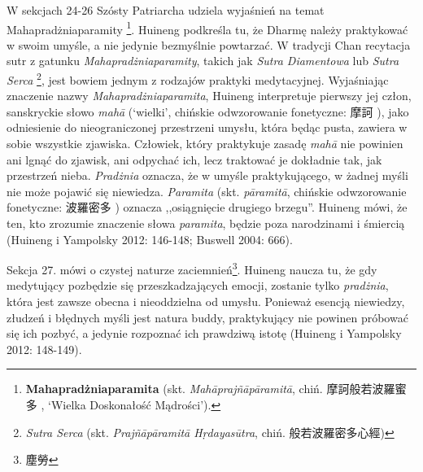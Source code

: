 W sekcjach 24-26 Szósty Patriarcha udziela wyjaśnień na temat Mahapradżniaparamity%
\footnote{\textbf{Mahapradżniaparamita} (skt. \textit{Mahāprajñāpāramitā}, chiń. 摩訶般若波羅蜜多 , `Wielka Doskonałość Mądrości').}.
Huineng podkreśla tu, że Dharmę należy praktykować w swoim umyśle, a nie jedynie bezmyślnie powtarzać.
W tradycji Chan recytacja sutr z gatunku \textit{Mahapradżniaparamity}, takich jak \textit{Sutra Diamentowa} lub \textit{Sutra Serca}%
\footnote{\textit{Sutra Serca} (skt. \textit{Prajñāpāramitā H\d{r}dayasūtra}, chiń. 般若波羅密多心經)},
jest bowiem jednym z rodzajów praktyki medytacyjnej.
Wyjaśniając znaczenie nazwy \textit{Mahapradżniaparamita}, Huineng interpretuje pierwszy jej człon, sanskryckie słowo \textit{mahā} (`wielki', chińskie odwzorowanie fonetyczne: 摩訶 ), jako odniesienie do nieograniczonej przestrzeni umysłu, która będąc pusta, zawiera w sobie wszystkie zjawiska.
Człowiek, który praktykuje zasadę \textit{mahā} nie powinien ani lgnąć do zjawisk, ani odpychać ich, lecz traktować je dokładnie tak, jak przestrzeń nieba.
\textit{Pradżnia} oznacza, że w umyśle praktykującego, w żadnej myśli nie może pojawić się niewiedza.
\textit{Paramita} (skt. \textit{pāramitā}, chińskie odwzorowanie fonetyczne: 波羅密多 ) oznacza ,,osiągnięcie drugiego brzegu''.
Huineng mówi, że ten, kto zrozumie znaczenie słowa \textit{paramita}, będzie poza narodzinami i śmiercią
(Huineng i Yampolsky 2012: 146-148; Buswell 2004: 666).

Sekcja 27. mówi o czystej naturze zaciemnień\footnote{塵勞 }.
Huineng naucza tu, że gdy medytujący pozbędzie się przeszkadzających emocji, zostanie tylko \textit{pradżnia}, która jest zawsze obecna i nieoddzielna od umysłu.
Ponieważ esencją niewiedzy, złudzeń i błędnych myśli jest natura buddy, praktykujący nie powinen próbować się ich pozbyć, a jedynie rozpoznać ich prawdziwą istotę
(Huineng i Yampolsky 2012: 148-149).

